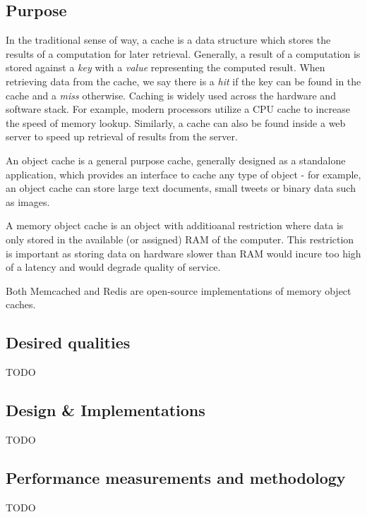 \subsection{Purpose}\label{purpose}

In the traditional sense of way, a cache is a data structure which
stores the results of a computation for later retrieval. Generally, a
result of a computation is stored against a \emph{key} with a
\emph{value} representing the computed result. When retrieving data from
the cache, we say there is a \emph{hit} if the key can be found in the
cache and a \emph{miss} otherwise. Caching is widely used across the
hardware and software stack. For example, modern processors utilize a
CPU cache to increase the speed of memory lookup. Similarly, a cache can
also be found inside a web server to speed up retrieval of results from
the server.

An object cache is a general purpose cache, generally designed as a
standalone application, which provides an interface to cache any type of
object - for example, an object cache can store large text documents,
small tweets or binary data such as images.

A memory object cache is an object with additioanal restriction where
data is only stored in the available (or assigned) RAM of the computer.
This restriction is important as storing data on hardware slower than
RAM would incure too high of a latency and would degrade quality of
service.

Both Memcached and Redis are open-source implementations of memory
object caches.

\subsection{Desired qualities}\label{desired-qualities}

TODO

\subsection{Design \& Implementations}\label{design-implementations}

TODO

\subsection{Performance measurements and
methodology}\label{performance-measurements-and-methodology}

TODO

